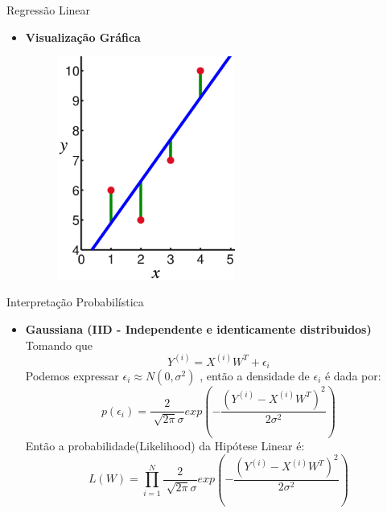\documentclass{beamer}
\begin{document}
 \begin{frame}{Regressão Linear}
\begin{itemize}
\item \textbf{Visualização Gráfica}
\begin{figure}
\centering
\includegraphics[width=0.55\textwidth]{MinimizarError.png}
\end{figure}
\end{itemize}
\end{frame}
 
 \begin{frame}{Interpretação Probabilística}
 \begin{itemize}
 \item \textbf{ Gaussiana (IID - Independente e identicamente distribuidos)}\\
 Tomando que 
 \begin{equation}
 Y^{(i)} = X^{(i)}W^T + \epsilon_i
 \end{equation}
 Podemos expressar $\epsilon_i \approx N(0,\sigma ^2)$ , então a densidade de $\epsilon_i$ é dada por:
 \begin{equation}
 p(\epsilon_i) = \frac{2}{\sqrt[]{2 \pi} \sigma} exp \left( - \frac{(Y^{(i)} - X^{(i)}W^T)^2}{2 \sigma ^2} \right)
 \end{equation}
 Então a probabilidade(Likelihood) da Hipótese Linear é:
 \begin{equation}
 L(W) = \prod_{i=1} ^N \frac{2}{\sqrt[]{2 \pi} \sigma} exp \left( - \frac{(Y^{(i)} - X^{(i)}W^T)^2}{2 \sigma ^2} \right)
 \end{equation}
 \end{itemize}
 \end{frame}
 
\end{document}
